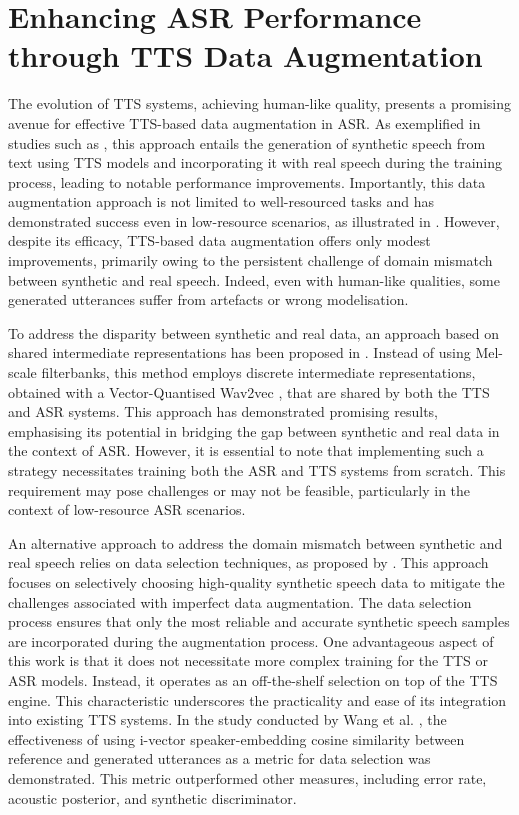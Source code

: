 \section{Enhancing ASR Performance through TTS Data Augmentation}
The evolution of \ac{TTS} systems, achieving human-like quality, presents a promising avenue for effective \ac{TTS}-based data augmentation in \ac{ASR}.
As exemplified in studies such as \cite{laptev2020you}, this approach entails the generation of synthetic speech from text using \ac{TTS} models and incorporating it with real speech during the training process, leading to notable performance improvements. Importantly, this data augmentation approach is not limited to well-resourced tasks and has demonstrated success even in low-resource scenarios, as illustrated in \cite{casanova2022asr}. However, despite its efficacy, \ac{TTS}-based data augmentation offers only modest improvements, primarily owing to the persistent challenge of domain mismatch between synthetic and real speech. Indeed, even with human-like qualities, some generated utterances suffer from artefacts or wrong modelisation.

To address the disparity between synthetic and real data, an approach based on shared intermediate representations has been proposed in \cite{9688218}. Instead of using Mel-scale filterbanks, this method employs discrete intermediate representations, obtained with a Vector-Quantised Wav2vec \cite{vqwav2vec}, that are shared by both the \ac{TTS} and \ac{ASR} systems. This approach has demonstrated promising results, emphasising its potential in bridging the gap between synthetic and real data in the context of \ac{ASR}. However, it is essential to note that implementing such a strategy necessitates training both the \ac{ASR} and \ac{TTS} systems from scratch. This requirement may pose challenges or may not be feasible, particularly in the context of low-resource \ac{ASR} scenarios.

An alternative approach to address the domain mismatch between synthetic and real speech relies on data selection techniques, as proposed by \cite{wang2021towards}. This approach focuses on selectively choosing high-quality synthetic speech data to mitigate the challenges associated with imperfect data augmentation. The data selection process ensures that only the most reliable and accurate synthetic speech samples are incorporated during the augmentation process. One advantageous aspect of this work is that it does not necessitate more complex training for the \ac{TTS} or \ac{ASR} models. Instead, it operates as an off-the-shelf selection on top of the \ac{TTS} engine. This characteristic underscores the practicality and ease of its integration into existing \ac{TTS} systems.
In the study conducted by Wang et al. \cite{wang2021towards}, the effectiveness of using i-vector speaker-embedding cosine similarity between reference and generated utterances as a metric for data selection was demonstrated. This metric outperformed other measures, including error rate, acoustic posterior, and synthetic discriminator.

